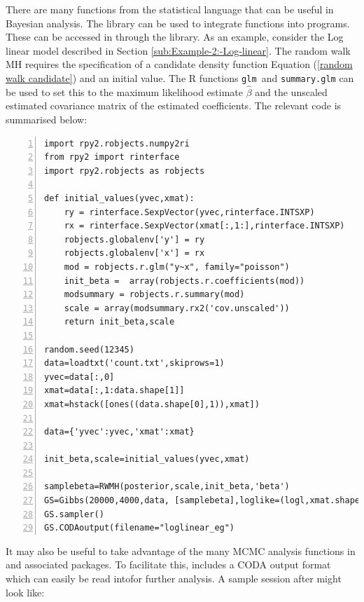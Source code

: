 \documentclass[article]{jss}
\begin{document}
There are many functions from the  statistical language
\citep{R} that can be useful in Bayesian analysis. The 
 library can be used to integrate 
functions into  programs. These can be accessed in
 through the   library. As an
example, consider the Log linear model described in Section
\ref{sub:Example-2:-Log-linear}. The random walk MH requires the
specification of a candidate density function Equation (\ref{random
  walk candidate}) and an initial value. The R functions \texttt{glm
}and \texttt{summary.glm} can be used to set this to the maximum
likelihood estimate $\hat{\beta}$ and the unscaled estimated
covariance matrix of the estimated coefficients. The relevant code is
summarised below:


\begin{lstlisting}[basicstyle={\scriptsize},numbers=left,tabsize=4]
import rpy2.robjects.numpy2ri
from rpy2 import rinterface
import rpy2.robjects as robjects

def initial_values(yvec,xmat):
    ry = rinterface.SexpVector(yvec,rinterface.INTSXP)
    rx = rinterface.SexpVector(xmat[:,1:],rinterface.INTSXP)
    robjects.globalenv['y'] = ry
    robjects.globalenv['x'] = rx
    mod = robjects.r.glm("y~x", family="poisson")
    init_beta =  array(robjects.r.coefficients(mod))
    modsummary = robjects.r.summary(mod)
    scale = array(modsummary.rx2('cov.unscaled'))
    return init_beta,scale

random.seed(12345) 
data=loadtxt('count.txt',skiprows=1)
yvec=data[:,0]
xmat=data[:,1:data.shape[1]]
xmat=hstack([ones((data.shape[0],1)),xmat])

data={'yvec':yvec,'xmat':xmat} 

init_beta,scale=initial_values(yvec,xmat)

samplebeta=RWMH(posterior,scale,init_beta,'beta')
GS=Gibbs(20000,4000,data, [samplebeta],loglike=(logl,xmat.shape[1],'yvec'))
GS.sampler()
GS.CODAoutput(filename="loglinear_eg") 

\end{lstlisting}


It may also be useful to take advantage of the many MCMC analysis
functions in  and associated packages. To facilitate this,
 includes a CODA
\citep{Rnews:Plummer+Best+Cowles+Vines:2006} output format which can
easily be read intofor further analysis. A sample
 session after  might look like:
\end{document}
